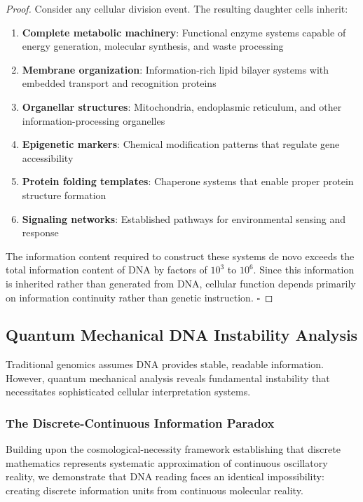 \documentclass[12pt,a4paper]{article}
\begin{document}
\begin{proof}
Consider any cellular division event. The resulting daughter cells inherit:

\begin{enumerate}
\item \textbf{Complete metabolic machinery}: Functional enzyme systems capable of energy generation, molecular synthesis, and waste processing
\item \textbf{Membrane organization}: Information-rich lipid bilayer systems with embedded transport and recognition proteins
\item \textbf{Organellar structures}: Mitochondria, endoplasmic reticulum, and other information-processing organelles
\item \textbf{Epigenetic markers}: Chemical modification patterns that regulate gene accessibility
\item \textbf{Protein folding templates}: Chaperone systems that enable proper protein structure formation
\item \textbf{Signaling networks}: Established pathways for environmental sensing and response
\end{enumerate}

The information content required to construct these systems de novo exceeds the total information content of DNA by factors of $10^3$ to $10^6$. Since this information is inherited rather than generated from DNA, cellular function depends primarily on information continuity rather than genetic instruction. $\square$
\end{proof}

\subsection{Quantum Mechanical DNA Instability Analysis}

Traditional genomics assumes DNA provides stable, readable information. However, quantum mechanical analysis reveals fundamental instability that necessitates sophisticated cellular interpretation systems.

\subsubsection{The Discrete-Continuous Information Paradox}

Building upon the cosmological-necessity framework establishing that discrete mathematics represents systematic approximation of continuous oscillatory reality, we demonstrate that DNA reading faces an identical impossibility: creating discrete information units from continuous molecular reality.
\end{document}
